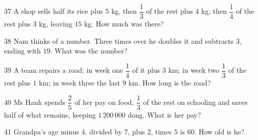 \gap
\begin{probbox}{37}{}
A shop sells half its rice plus $5$ kg, then $\dfrac13$ of the rest plus $4$ kg, then $\dfrac14$ of the rest plus $3$ kg, leaving $15$ kg. How much was there?
\end{probbox}
\gap
\begin{probbox}{38}{}
Nam thinks of a number. Three times over he doubles it and subtracts $3$, ending with $19$. What was the number?
\end{probbox}
\gap
\begin{probbox}{39}{}
A team repairs a road: in week one $\dfrac14$ of it plus $3$ km; in week two $\dfrac13$ of the rest plus $1$ km; in week three the last $9$ km. How long is the road?
\end{probbox}
\gap
\begin{probbox}{40}{}
Ms Hanh spends $\dfrac25$ of her pay on food, $\dfrac13$ of the rest on schooling and saves half of what remains, keeping $1\,200\,000$ dong. What is her pay?
\end{probbox}
\gap
\begin{probbox}{41}{}
Grandpa's age minus $4$, divided by $7$, plus $2$, times $5$ is $60$. How old is he?
\end{probbox}
